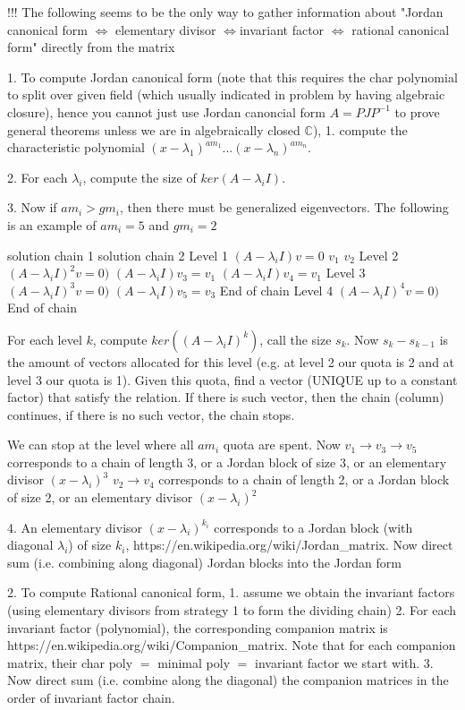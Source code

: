 !!! The following seems to be the only way to gather information about "Jordan canonical form $\iff$ elementary divisor $\iff$invariant factor $\iff$ rational canonical form" directly from the matrix

1. To compute Jordan canonical form (note that this requires the char polynomial to split over given field (which usually indicated in problem by having algebraic closure), hence you cannot just use Jordan canoncial form $A= PJP^{-1}$ to prove general theorems unless we are in algebraically closed $ \mathbb{C}$),
	1. compute the characteristic polynomial $(x-\lambda_1)^{am_1}...(x-\lambda_n)^{am_n}$.
    
    2. For each $\lambda_i$, compute the size of $ker(A-\lambda_iI)$.
    
    
    3. Now if $am_i > gm_i$, then there must be generalized eigenvectors. The following is an example of $am_i = 5$ and $gm_i = 2$
    
    											    solution chain 1			solution chain 2 
    Level 1 $(A-\lambda_i I)v = 0$						$v_1$						   $v_2$
    Level 2 $(A-\lambda_i I)^2v = 0)$		$(A-\lambda_i I)v_3 = v_1$ 	    $(A-\lambda_i I)v_4 = v_1$ 
    Level 3 $(A-\lambda_i I)^3v = 0)$		$(A-\lambda_iI)v_5 = v_3$		End of chain
    Level 4 $(A-\lambda_i I)^4v= 0)$		End of chain
    
    For each level $k$, compute $ker((A-\lambda_iI)^k)$, call the size $s_k$. Now $s_k - s_{k-1}$ is the amount of vectors allocated for this level (e.g. at level 2 our quota is 2 and at level 3 our quota is 1). Given this quota, find a vector (UNIQUE up to a constant factor) that satisfy the relation. If there is such vector, then the chain (column) continues, if there is no such vector, the chain stops.
    
    We can stop at the level where all $am_i$ quota are spent. Now 
    $v_1 \to v_3 \to v_5$ corresponds to a chain of length 3, or a Jordan block of size 3, or an elementary divisor $(x-\lambda_i)^3$
    $v_2 \to v_4$  corresponds to a chain of length 2, or a Jordan block of size 2, or an elementary divisor $(x-\lambda_i)^2$

	4. An elementary divisor $(x-\lambda_i)^{k_i}$ corresponds to a Jordan block (with diagonal $\lambda_i$) of size $k_i$, https://en.wikipedia.org/wiki/Jordan_matrix. Now direct sum (i.e. combining along diagonal) Jordan blocks into the Jordan form


2. To compute Rational canonical form,
	1. assume we obtain the invariant factors (using elementary divisors from strategy 1 to form the dividing chain)
    2. For each invariant factor (polynomial), the corresponding companion matrix is https://en.wikipedia.org/wiki/Companion_matrix. Note that for each companion matrix, their char poly $=$ minimal poly $=$ invariant factor we start with.
    3. Now direct sum (i.e. combine along the diagonal) the companion matrices in the order of invariant factor chain.
    
